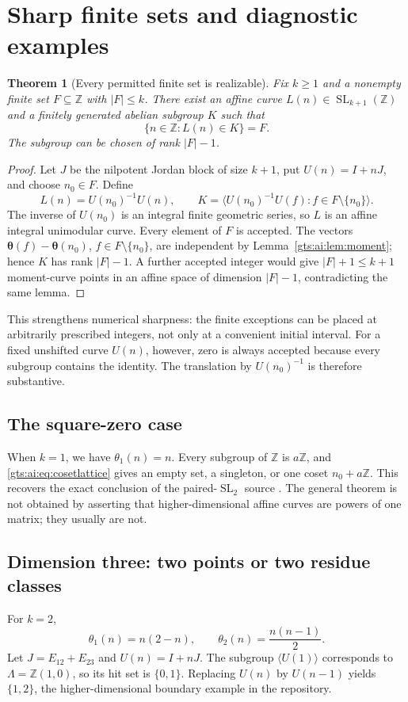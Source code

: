 \documentclass[11pt,letterpaper]{article}
\newtheorem{theorem}{Theorem}[section]
\theoremstyle{definition}
\theoremstyle{remark}
\newcommand{\Z}{\mathbb Z}
\newcommand{\SL}{\operatorname{SL}}
\newcommand{\vv}{\boldsymbol\theta}
\begin{document}
\section{Sharp finite sets and diagnostic examples}\label{gts:ai:sec:examples}
\begin{theorem}[Every permitted finite set is realizable]\label{gts:ai:thm:finitesharp}
Fix $k\ge1$ and a nonempty finite set $F\subseteq\Z$ with $|F|\le k$. There exist an affine curve $L(n)\in\SL_{k+1}(\Z)$ and a finitely generated abelian subgroup $K$ such that
\[
 \{n\in\Z:L(n)\in K\}=F.
\]
The subgroup can be chosen of rank $|F|-1$.
\end{theorem}
\begin{proof}
Let $J$ be the nilpotent Jordan block of size $k+1$, put $U(n)=I+nJ$, and choose $n_0\in F$. Define
\[
 L(n)=U(n_0)^{-1}U(n),\qquad
 K=\langle U(n_0)^{-1}U(f):f\in F\setminus\{n_0\}\rangle.
\]
The inverse of $U(n_0)$ is an integral finite geometric series, so $L$ is an affine integral unimodular curve. Every element of $F$ is accepted. The vectors
$\vv(f)-\vv(n_0)$, $f\in F\setminus\{n_0\}$, are independent by Lemma~\ref{gts:ai:lem:moment}; hence $K$ has rank $|F|-1$. A further accepted integer would give $|F|+1\le k+1$ moment-curve points in an affine space of dimension $|F|-1$, contradicting the same lemma.
\end{proof}
This strengthens numerical sharpness: the finite exceptions can be placed at arbitrarily prescribed integers, not only at a convenient initial interval. For a fixed unshifted curve $U(n)$, however, zero is always accepted because every subgroup contains the identity. The translation by $U(n_0)^{-1}$ is therefore substantive.

\subsection{The square-zero case}
When $k=1$, we have $\theta_1(n)=n$. Every subgroup of $\Z$ is $a\Z$, and \eqref{gts:ai:eq:cosetlattice} gives an empty set, a singleton, or one coset $n_0+a\Z$. This recovers the exact conclusion of the paired-$\SL_2$ source \cite{ai-repoaffine}. The general theorem is not obtained by asserting that higher-dimensional affine curves are powers of one matrix; they usually are not.

\subsection{Dimension three: two points or two residue classes}
For $k=2$,
\begin{equation}\label{gts:ai:eq:k2coordinates}
 \theta_1(n)=n(2-n),\qquad \theta_2(n)=\frac{n(n-1)}2.
\end{equation}
Let $J=E_{12}+E_{23}$ and $U(n)=I+nJ$. The subgroup $\langle U(1)\rangle$ corresponds to $\Lambda=\Z(1,0)$, so its hit set is $\{0,1\}$. Replacing $U(n)$ by $U(n-1)$ yields $\{1,2\}$, the higher-dimensional boundary example in the repository.
\end{document}
